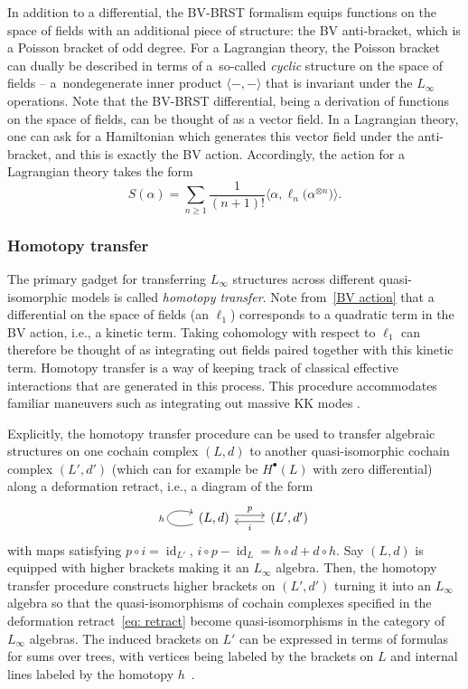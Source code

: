 \documentclass[10pt,a4paper]{amsart}
\numberwithin{equation}{section}
\theoremstyle{definition}
\DeclareMathOperator{\id}{id}
\begin{document}
In addition to a differential, the BV-BRST formalism equips functions on the space of fields with an additional piece of structure: the BV anti-bracket, which is a Poisson bracket of odd degree. For a Lagrangian theory, the Poisson bracket can dually be described in terms of a~so-called \textit{cyclic} structure on the space of fields -- a~nondegenerate inner product $\langle -, - \rangle$ that is invariant under the $L_\infty$ operations. Note that the BV-BRST differential, being a derivation of functions on the space of fields, can be thought of as a vector field. In a Lagrangian theory, one can ask for a Hamiltonian which generates this vector field under the anti-bracket, and this is exactly the BV action. Accordingly, the action for a Lagrangian theory takes the form
\begin{equation}\label{BV action}
S(\alpha) = \sum_{n\geq 1} \frac{1}{(n+1)!} \big\langle \alpha, \ell_n \big(\alpha^{\otimes n}\big) \big\rangle.
\end{equation}

\subsubsection{Homotopy transfer}
The primary gadget for transferring $L_{\infty}$ structures across different quasi-isomorphic models is called \textit{homotopy transfer}. Note from~\eqref{BV action} that a differential on the space of fields (an $\ell_1$) corresponds to a quadratic term in the BV action, i.e., a kinetic term. Taking cohomology with respect to $\ell_1$ can therefore be thought of as integrating out fields paired together with this kinetic term. Homotopy transfer is a way of keeping track of classical effective interactions that are generated in this process. This procedure accommodates familiar maneuvers such as integrating out massive KK modes \cite{Zeng:2023qqp}.

Explicitly, the homotopy transfer procedure can be used to transfer algebraic structures on one cochain complex $(L,d)$ to another quasi-isomorphic cochain complex $(L' ,d')$ (which can for example be $H^\bullet(L)$ with zero differential) along a deformation retract, i.e., a diagram of the form%
\begin{equation}
\begin{tikzcd}
	\arrow[loop left]{l}{h}(L , d )\arrow[r, shift left, "p"] & (L' , d')\arrow[l, shift left, "i"]
	\end{tikzcd}\label{eq: retract}
\end{equation}
with maps satisfying
$
 p \circ i = \id_{L'} $, $ i \circ p - \id_L = h \circ d + d \circ h$.
Say $(L,d)$ is equipped with higher brackets making it an $L_\infty$ algebra. Then, the homotopy transfer procedure constructs higher brackets on $(L',d')$ turning it into an $L_\infty$ algebra so that the quasi-isomorphisms of cochain complexes specified in the deformation retract~\eqref{eq: retract} become quasi-isomorphisms in the category of $L_\infty$ algebras. The induced brackets on $L'$ can be expressed in terms of formulas for sums over trees, with vertices being labeled by the brackets on $L$ and internal lines labeled by the homotopy $h$~\cite{LodayVallette}.
\end{document}
